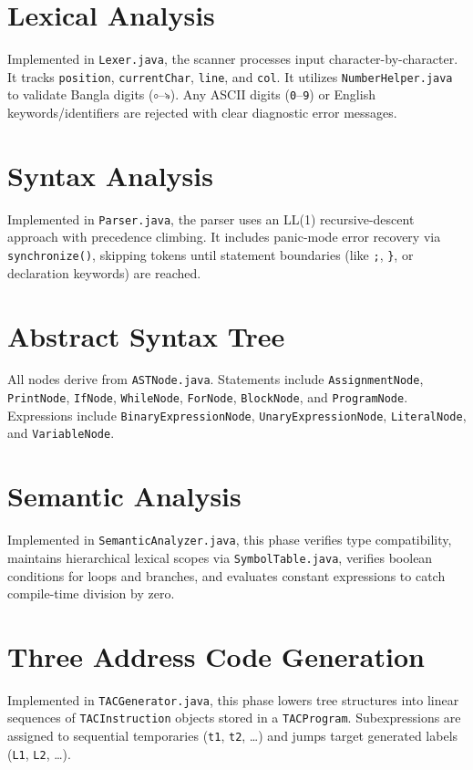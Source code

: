 \documentclass[12pt, a4paper]{report}
\begin{document}
\section{Lexical Analysis}
Implemented in \texttt{Lexer.java}, the scanner processes input character-by-character. It tracks \texttt{position}, \texttt{currentChar}, \texttt{line}, and \texttt{col}. It utilizes \texttt{NumberHelper.java} to validate Bangla digits (\texttt{০}--\texttt{৯}). Any ASCII digits (\texttt{0}--\texttt{9}) or English keywords/identifiers are rejected with clear diagnostic error messages.

\section{Syntax Analysis}
Implemented in \texttt{Parser.java}, the parser uses an LL(1) recursive-descent approach with precedence climbing. It includes panic-mode error recovery via \texttt{synchronize()}, skipping tokens until statement boundaries (like \texttt{;}, \texttt{\}}, or declaration keywords) are reached.

\section{Abstract Syntax Tree}
All nodes derive from \texttt{ASTNode.java}. Statements include \texttt{AssignmentNode}, \texttt{PrintNode}, \texttt{IfNode}, \texttt{WhileNode}, \texttt{ForNode}, \texttt{BlockNode}, and \texttt{ProgramNode}. Expressions include \texttt{BinaryExpressionNode}, \texttt{UnaryExpressionNode}, \texttt{LiteralNode}, and \texttt{VariableNode}.

\section{Semantic Analysis}
Implemented in \texttt{SemanticAnalyzer.java}, this phase verifies type compatibility, maintains hierarchical lexical scopes via \texttt{SymbolTable.java}, verifies boolean conditions for loops and branches, and evaluates constant expressions to catch compile-time division by zero.

\section{Three Address Code Generation}
Implemented in \texttt{TACGenerator.java}, this phase lowers tree structures into linear sequences of \texttt{TACInstruction} objects stored in a \texttt{TACProgram}. Subexpressions are assigned to sequential temporaries (\texttt{t1}, \texttt{t2}, \dots) and jumps target generated labels (\texttt{L1}, \texttt{L2}, \dots).
\end{document}

